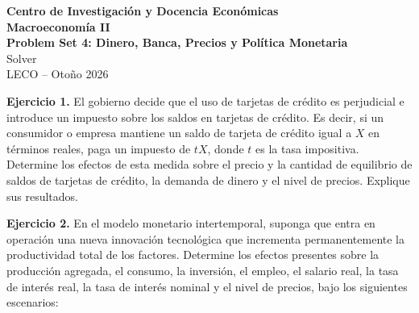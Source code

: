 \documentclass[11pt]{article}
\begin{document}
\begin{center}
  {\large\textbf{Centro de Investigación y Docencia Económicas}}\\[0.25em]
  {\large\textbf{Macroeconomía II}}\\[0.2em]
  {\large\textbf{Problem Set 4: Dinero, Banca, Precios y Política Monetaria} \\
  Solver}\\[0.35em]
  LECO -- Otoño 2026
\end{center}

\vspace{0.6em}

\textbf{Ejercicio 1.} El gobierno decide que el uso de tarjetas de crédito es perjudicial e introduce un impuesto sobre los saldos en tarjetas de crédito. Es decir, si un consumidor o empresa mantiene un saldo de tarjeta de crédito igual a \(X\) en términos reales, paga un impuesto de \(tX\), donde \(t\) es la tasa impositiva. Determine los efectos de esta medida sobre el precio y la cantidad de equilibrio de saldos de tarjetas de crédito, la demanda de dinero y el nivel de precios. Explique sus resultados.

\vspace{0.5em}

\textbf{Ejercicio 2.} En el modelo monetario intertemporal, suponga que entra en operación una nueva innovación tecnológica que incrementa permanentemente la productividad total de los factores. Determine los efectos presentes sobre la producción agregada, el consumo, la inversión, el empleo, el salario real, la tasa de interés real, la tasa de interés nominal y el nivel de precios, bajo los siguientes escenarios:
\end{document}
